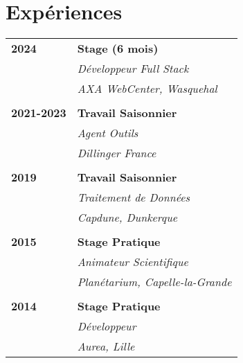 \documentclass[a4paper, 12pt]{article}
\begin{document}
\begin{minipage}[t]{0.65\textwidth}
    \section*{\textcolor{sectioncolor}{Expériences}}
    \begin{tabular}{ m{} m{} }
        \textbf{2024} & \textbf{Stage (6 mois)} \\
        & \textit{Développeur Full Stack} \\
        & \textit{AXA WebCenter, Wasquehal} \\
        & \\
        \textbf{2021-2023} & \textbf{Travail Saisonnier} \\
        & \textit{Agent Outils} \\
        & \textit{Dillinger France} \\
        & \\
        \textbf{2019} & \textbf{Travail Saisonnier} \\
        & \textit{Traitement de Données} \\
        & \textit{Capdune, Dunkerque} \\
        & \\
        \textbf{2015} & \textbf{Stage Pratique} \\
        & \textit{Animateur Scientifique} \\
        & \textit{Planétarium, Capelle-la-Grande} \\
        & \\
        \textbf{2014} & \textbf{Stage Pratique} \\
        & \textit{Développeur} \\
        & \textit{Aurea, Lille} \\
    \end{tabular}

\end{minipage}
\end{document}
